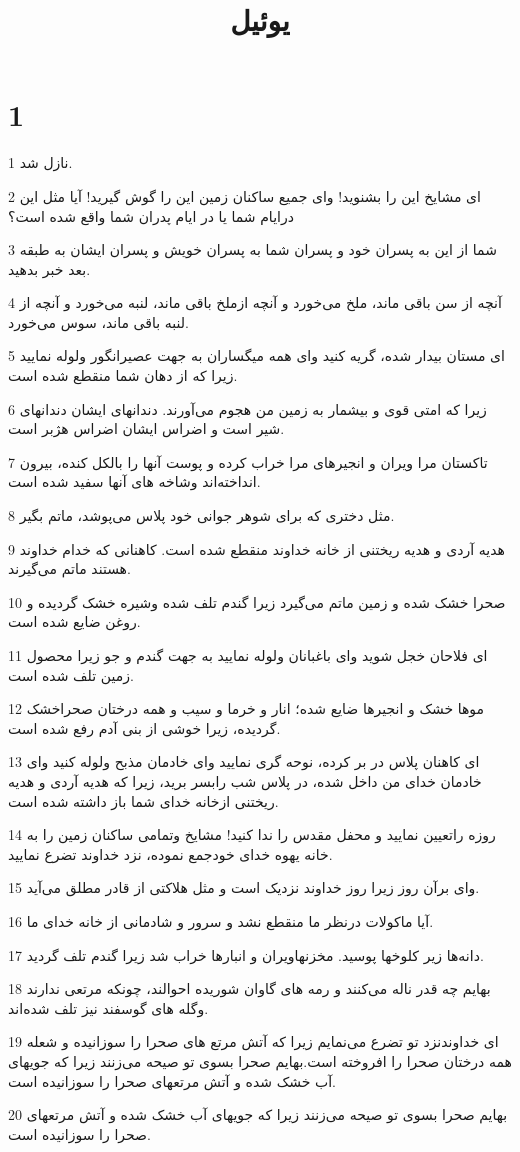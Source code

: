 

\title{يوئيل}


\chapter{1}

\par 1 نازل شد.
\par 2 ‌ای مشایخ این را بشنوید! و‌ای جمیع ساکنان زمین این را گوش گیرید! آیا مثل این درایام شما یا در ایام پدران شما واقع شده است؟
\par 3 شما از این به پسران خود و پسران شما به پسران خویش و پسران ایشان به طبقه بعد خبر بدهید.
\par 4 آنچه از سن باقی ماند، ملخ می‌خورد و آنچه ازملخ باقی ماند، لنبه می‌خورد و آنچه از لنبه باقی ماند، سوس می‌خورد.
\par 5 ‌ای مستان بیدار شده، گریه کنید و‌ای همه میگساران به جهت عصیرانگور ولوله نمایید زیرا که از دهان شما منقطع شده است.
\par 6 زیرا که امتی قوی و بیشمار به زمین من هجوم می‌آورند. دندانهای ایشان دندانهای شیر است و اضراس ایشان اضراس هژبر است.
\par 7 تاکستان مرا ویران و انجیرهای مرا خراب کرده و پوست آنها را بالکل کنده، بیرون انداخته‌اند وشاخه های آنها سفید شده است.
\par 8 مثل دختری که برای شوهر جوانی خود پلاس می‌پوشد، ماتم بگیر.
\par 9 هدیه آردی و هدیه ریختنی از خانه خداوند منقطع شده است. کاهنانی که خدام خداوند هستند ماتم می‌گیرند.
\par 10 صحرا خشک شده و زمین ماتم می‌گیرد زیرا گندم تلف شده وشیره خشک گردیده و روغن ضایع شده است.
\par 11 ‌ای فلاحان خجل شوید و‌ای باغبانان ولوله نمایید به جهت گندم و جو زیرا محصول زمین تلف شده است.
\par 12 موها خشک و انجیرها ضایع شده؛ انار و خرما و سیب و همه درختان صحراخشک گردیده، زیرا خوشی از بنی آدم رفع شده است.
\par 13 ‌ای کاهنان پلاس در بر کرده، نوحه گری نمایید و‌ای خادمان مذبح ولوله کنید و‌ای خادمان خدای من داخل شده، در پلاس شب رابسر برید، زیرا که هدیه آردی و هدیه ریختنی ازخانه خدای شما باز داشته شده است.
\par 14 روزه راتعیین نمایید و محفل مقدس را ندا کنید! مشایخ وتمامی ساکنان زمین را به خانه یهوه خدای خودجمع نموده، نزد خداوند تضرع نمایید.
\par 15 وای برآن روز زیرا روز خداوند نزدیک است و مثل هلاکتی از قادر مطلق می‌آید.
\par 16 آیا ماکولات درنظر ما منقطع نشد و سرور و شادمانی از خانه خدای ما.
\par 17 دانه‌ها زیر کلوخها پوسید. مخزنهاویران و انبارها خراب شد زیرا گندم تلف گردید.
\par 18 بهایم چه قدر ناله می‌کنند و رمه های گاوان شوریده احوالند، چونکه مرتعی ندارند وگله های گوسفند نیز تلف شده‌اند.
\par 19 ‌ای خداوندنزد تو تضرع می‌نمایم زیرا که آتش مرتع های صحرا را سوزانیده و شعله همه درختان صحرا را افروخته است.بهایم صحرا بسوی تو صیحه می‌زنند زیرا که جویهای آب خشک شده و آتش مرتعهای صحرا را سوزانیده است.
\par 20 بهایم صحرا بسوی تو صیحه می‌زنند زیرا که جویهای آب خشک شده و آتش مرتعهای صحرا را سوزانیده است.

